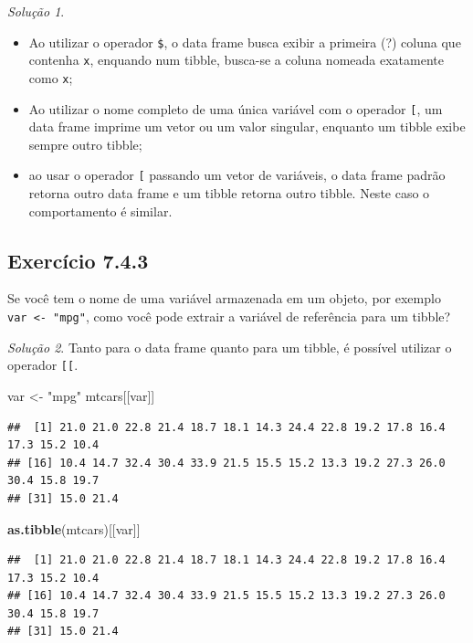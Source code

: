 \documentclass[
]{latex/krantz}
\newenvironment{Shaded}{\begin{snugshade}}{\end{snugshade}}
\newcommand{\FunctionTok}[1]{\textcolor[rgb]{0.13,0.29,0.53}{\textbf{#1}}}
\newcommand{\NormalTok}[1]{#1}
\newcommand{\OtherTok}[1]{\textcolor[rgb]{0.56,0.35,0.01}{#1}}
\newcommand{\StringTok}[1]{\textcolor[rgb]{0.31,0.60,0.02}{#1}}
\providecommand{\tightlist}{%
  \setlength{\itemsep}{0pt}\setlength{\parskip}{0pt}}
\theoremstyle{definition}
\theoremstyle{definition}
\theoremstyle{definition}
\theoremstyle{definition}
\theoremstyle{remark}
\newtheorem*{solution}{Solução}
\begin{document}
\begin{solution}
\begin{itemize}
\tightlist
\item
  Ao utilizar o operador \texttt{\$}, o data frame busca exibir a primeira (?) coluna que contenha \texttt{x}, enquando num tibble, busca-se a coluna nomeada exatamente como \texttt{x};
\item
  Ao utilizar o nome completo de uma única variável com o operador \texttt{{[}}, um data frame imprime um vetor ou um valor singular, enquanto um tibble exibe sempre outro tibble;
\item
  ao usar o operador \texttt{{[}} passando um vetor de variáveis, o data frame padrão retorna outro data frame e um tibble retorna outro tibble. Neste caso o comportamento é similar.
\end{itemize}

\end{solution}

\hypertarget{exr7-4-3}{%
\subsection*{Exercício 7.4.3}\label{exr7-4-3}}

Se você tem o nome de uma variável armazenada em um objeto, por exemplo \texttt{var\ \textless{}-\ "mpg"}, como você pode extrair a variável de referência para um tibble?

\begin{solution}

Tanto para o data frame quanto para um tibble, é possível utilizar o operador \texttt{{[}{[}}.

\begin{Shaded}
\begin{Highlighting}[]
\NormalTok{var }\OtherTok{\textless{}{-}} \StringTok{"mpg"}
\NormalTok{mtcars[[var]]}
\end{Highlighting}
\end{Shaded}

\begin{verbatim}
##  [1] 21.0 21.0 22.8 21.4 18.7 18.1 14.3 24.4 22.8 19.2 17.8 16.4 17.3 15.2 10.4
## [16] 10.4 14.7 32.4 30.4 33.9 21.5 15.5 15.2 13.3 19.2 27.3 26.0 30.4 15.8 19.7
## [31] 15.0 21.4
\end{verbatim}

\begin{Shaded}
\begin{Highlighting}[]
\FunctionTok{as.tibble}\NormalTok{(mtcars)[[var]]}
\end{Highlighting}
\end{Shaded}

\begin{verbatim}
##  [1] 21.0 21.0 22.8 21.4 18.7 18.1 14.3 24.4 22.8 19.2 17.8 16.4 17.3 15.2 10.4
## [16] 10.4 14.7 32.4 30.4 33.9 21.5 15.5 15.2 13.3 19.2 27.3 26.0 30.4 15.8 19.7
## [31] 15.0 21.4
\end{verbatim}

\end{solution}
\end{document}
